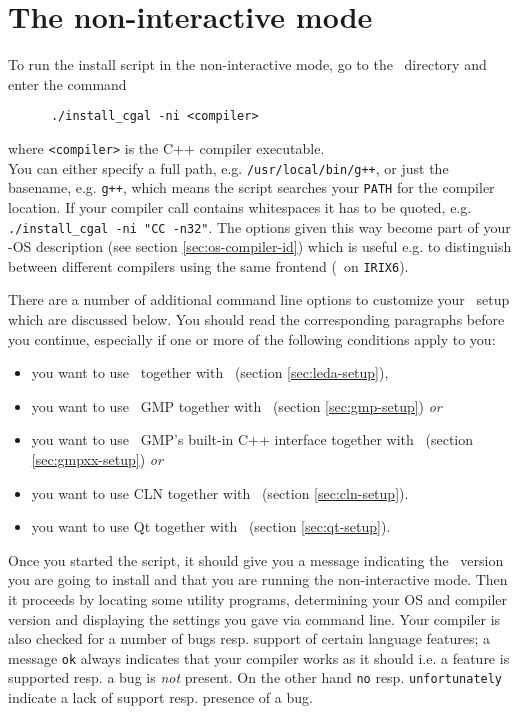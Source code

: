 \section{The non-interactive mode}\label{sec:non-interactive}

To run the install script in the non-interactive mode, go to the
\cgaldir\ directory and enter the command
\begin{verbatim}
      ./install_cgal -ni <compiler>
\end{verbatim}
where \texttt{<compiler>} is the C++ compiler
executable.\\ You can either specify a full
path, e.g. \texttt{/usr/local/bin/g++}, or just the basename, e.g.
\texttt{g++}, which means the script searches your \texttt{PATH} for
the compiler location. If your compiler call contains whitespaces it
has to be quoted, e.g.  \texttt{./install\_cgal -ni "CC -n32"}.  The
options given this way become part of your \cgal-OS
description (see section
\ref{sec:os-compiler-id}) which is useful e.g. to distinguish between
different compilers using the same frontend (\mipsprocc\ on
\texttt{IRIX6}).

There are a number of additional command line options to customize
your \cgal\ setup which are discussed below. You should read the
corresponding paragraphs before you continue, especially if one or
more of the following conditions apply to you:
\begin{itemize}
\item you want to use \leda\ together with \cgal\ (section
  \ref{sec:leda-setup}),
\item you want to use \gnu\ GMP together with \cgal\ (section
  \ref{sec:gmp-setup}) \textit{or}
\item you want to use \gnu\ GMP's built-in C++ interface together with \cgal\
  (section \ref{sec:gmpxx-setup}) \textit{or}
\item you want to use CLN together with \cgal\ (section
  \ref{sec:cln-setup}).
\item you want to use Qt together with \cgal\ (section
  \ref{sec:qt-setup}).
\end{itemize}

Once you started the script, it should give you a message indicating
the \cgal\ version you are going to install and that you are running
the non-interactive mode. Then it proceeds by locating some utility
programs, determining your OS and compiler version and displaying the
settings you gave via command line. Your compiler is also checked for
a number of bugs resp. support of certain language features; a message
\texttt{ok} always indicates that your compiler works as it should
i.e. a feature is supported resp. a bug is \textit{not} present. On
the other hand \texttt{no} resp.  \texttt{unfortunately} indicate a
lack of support resp. presence of a bug.

